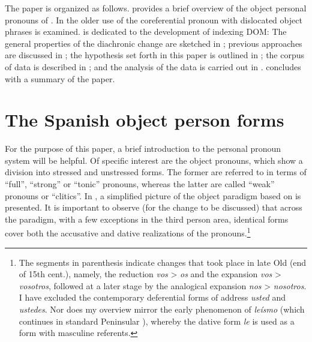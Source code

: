 \documentclass[output=paper]{LSP/langsci}
\begin{document}
 The paper is organized as follows.  provides a brief overview of the object personal pronouns of . In    the older use of the coreferential pronoun with dislocated object phrases is examined.  is dedicated to the development of  indexing DOM: The general properties of the diachronic change are sketched in ; previous approaches are discussed in ; the hypothesis set forth in this paper is outlined in ; the corpus of data is described in ; and the analysis of the data is carried out in .  concludes with a summary of the paper. 

\section{The Spanish object person forms}
\label{04-me-sec:2}

For the purpose of this paper, a brief introduction to the  personal pronoun system will be helpful. Of specific interest are the object pronouns, which show a division into stressed and unstressed forms. The former are referred to in terms of “full”, “strong” or “tonic” pronouns, whereas the latter are called “weak” pronouns or “clitics”. In , a simplified picture of the object paradigm based on \citet[119]{Pennyetal1991History} is presented. It is important to observe (for the change to be discussed) that across the paradigm, with a few exceptions in the third person area, identical forms cover both the accusative and dative realizations of the pronouns.\footnote{The segments in parenthesis indicate changes that took place in late Old  (end of 15th cent.), namely, the reduction \textit{vos} > \textit{os} and the expansion \textit{vos} > \textit{vosotros}, followed at a later stage by the analogical expansion \textit{nos} > \textit{nosotros}. I have excluded the contemporary deferential forms of address \textit{usted} and \textit{ustedes}. Nor does my overview mirror the early phenomenon of \textit{leísmo} (which continues in standard Peninsular ), whereby the dative form \textit{le} is used as a  form with masculine referents.} 
\end{document}
